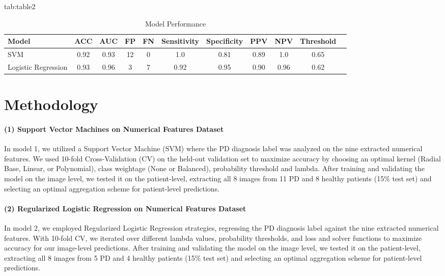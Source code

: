 \documentclass[pmlr,twocolumn,10pt]{jmlr} %
\begin{document}
\begin{table*}[hbtp]
\centering 
\floatconts
{tab:table2}
{\caption{Model Performance} }
    {
        \begin{tabular}{lcccccccccc}
        \toprule
        \bfseries Model & \bfseries ACC & \bfseries AUC & \bfseries FP & \bfseries FN & \bfseries Sensitivity & \bfseries Specificity & \bfseries PPV & \bfseries NPV & \bfseries Threshold \\
        \midrule
        SVM & 0.92 & 0.93 & 12 & 0 & 1.0 & 0.81 & 0.89 & 1.0 & 0.65 \\
        Logistic Regression & 0.93 & 0.96 & 3 & 7 & 0.92 & 0.95 & 0.90 & 0.96 & 0.62 \\
        \bottomrule
        \end{tabular}
    }
\end{table*}

\section{Methodology}
\label{Methodology}

\label{sec:SVM}  
\paragraph{(1) Support Vector Machines on Numerical Features Dataset} In model 1, we utilized a Support Vector Machine (SVM) \citep{708428} where the PD diagnosis label was analyzed on the nine extracted numerical features. We used 10-fold Cross-Validation (CV) on the held-out validation set to maximize accuracy by choosing an optimal kernel (Radial Base, Linear, or Polynomial), class weightage (None or Balanced), probability threshold and lambda. After training and validating the model on the image level, we tested it on the patient-level, extracting all 8 images from 11 PD and 8 healthy patients (15\% test set) and selecting an optimal aggregation scheme for patient-level predictions.  

\label{sec:LogReg}  
\paragraph{(2) Regularized Logistic Regression on Numerical Features Dataset} In model 2, we employed Regularized Logistic Regression \citep{tibshirani1996regression} strategies, regressing the PD diagnosis label against the nine extracted numerical features. With 10-fold CV, we iterated over different lambda values, probability thresholds, and loss and solver functions to maximize accuracy for our image-level predictions. After training and validating the model on the image level, we tested it on the patient-level, extracting all 8 images from 5 PD and 4 healthy patients (15\% test set) and selecting an optimal aggregation scheme for patient-level predictions.  
\end{document}
